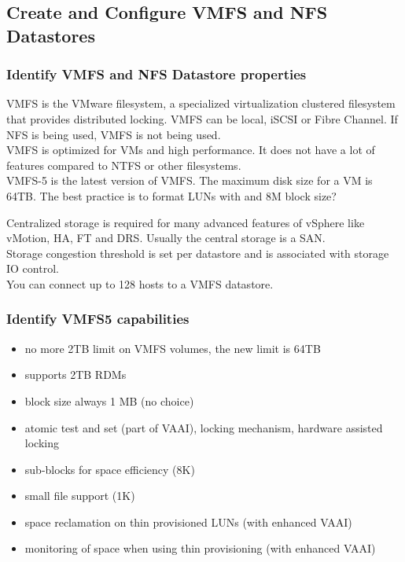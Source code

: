 \subsection{Create and Configure VMFS and NFS Datastores}

\subsubsection{Identify VMFS and NFS Datastore properties}

VMFS is the VMware filesystem, a specialized virtualization clustered
filesystem that provides distributed locking. VMFS can be local, iSCSI or
Fibre Channel. If NFS is being used, VMFS is not being used.\\

VMFS is optimized for VMs and high performance. It does not have a lot of
features compared to NTFS or other filesystems.\\

VMFS-5 is the latest version of VMFS. The maximum disk size for a VM is
64TB. The best practice is to format LUNs with and 8M block size?

Centralized storage is required for many advanced features of vSphere like
vMotion, HA, FT and DRS. Usually the central storage is a SAN.\\

Storage congestion threshold is set per datastore and is associated with
storage IO control.\\

You can connect up to 128 hosts to a VMFS datastore.

\subsubsection{Identify VMFS5 capabilities}

\begin{itemize}

\item no more 2TB limit on VMFS volumes, the new limit is 64TB
\item supports 2TB RDMs
\item block size always 1 MB (no choice)
\item atomic test and set (part of VAAI), locking mechanism, hardware assisted
locking
\item sub-blocks for space efficiency (8K)
\item small file support (1K)
\item space reclamation on thin provisioned LUNs (with enhanced VAAI)
\item monitoring of space when using thin provisioning (with enhanced VAAI)

\end{itemize}

